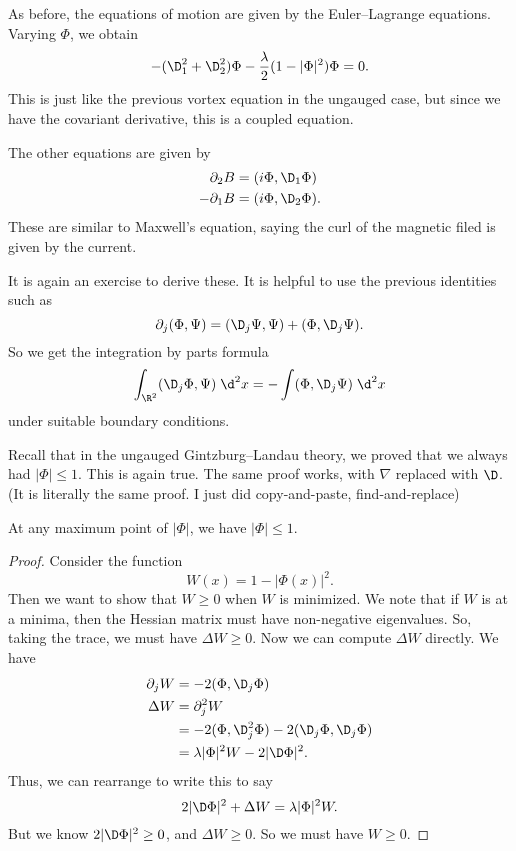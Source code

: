 \documentclass[a4paper]{article}
\begin{document}
As before, the equations of motion are given by the Euler--Lagrange equations. Varying $\Phi$, we obtain
\[
  - (\D_1^2 + \D_2^2) \Phi - \frac{\lambda}{2} (1 - |\Phi|^2)\Phi = 0.
\]
This is just like the previous vortex equation in the ungauged case, but since we have the covariant derivative, this is a coupled equation.

The other equations are given by
\begin{align*}
  \partial_2 B &= (i \Phi, \D_1 \Phi)\\
  -\partial_1 B &= (i \Phi, \D_2 \Phi).
\end{align*}
These are similar to Maxwell's equation, saying the curl of the magnetic filed is given by the current.

It is again an exercise to derive these. It is helpful to use the previous identities such as
\[
  \partial_j (\Phi, \Psi) = (\D_j \Psi, \Psi) + (\Phi, \D_j \Psi).
\]
So we get the integration by parts formula
\[
  \int_{\R^2} (\D_j \Phi, \Psi)\;\d^2 x = - \int (\Phi, \D_j \Psi)\;\d^2 x
\]
under suitable boundary conditions.

Recall that in the ungauged Gintzburg--Landau theory, we proved that we always had $|\Phi| \leq 1$. This is again true. The same proof works, with $\nabla$ replaced with $\D$. (It is literally the same proof. I just did copy-and-paste, find-and-replace)
\begin{lemma}
  At any maximum point of $|\Phi|$, we have $|\Phi| \leq 1$.
\end{lemma}

\begin{proof}
  Consider the function
  \[
    W(x) = 1 - |\Phi(x)|^2.
  \]
  Then we want to show that $W \geq 0$ when $W$ is minimized. We note that if $W$ is at a minima, then the Hessian matrix must have non-negative eigenvalues. So, taking the trace, we must have $\Delta W \geq 0$. Now we can compute $\Delta W$ directly. We have
  \begin{align*}
    \partial_j W &= -2 (\Phi, \D_j \Phi)\\
    \Delta W &= \partial_j^2 W \\
    &= - 2(\Phi, \D_j^2 \Phi) - 2(\D_j \Phi, \D_j \Phi)\\
    &= \lambda |\Phi|^2 W - 2 |\D \Phi|^2.
  \end{align*}
  Thus, we can rearrange to write this to say
  \[
    2 |\D \Phi|^2 + \Delta W = \lambda |\Phi|^2 W.
  \]
  But we know $2 |\D \Phi|^2 \geq 0$, and $\Delta W \geq 0$. So we must have $W \geq 0$.
\end{proof}
\end{document}
